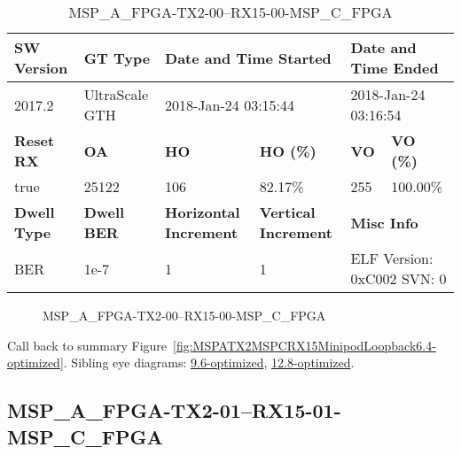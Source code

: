 \begin{table}[h]
\centering
\caption{MSP\_A\_FPGA-TX2-00--RX15-00-MSP\_C\_FPGA}
\label{tab:MSPAFPGATX200RX1500MSPCFPGA6.4-optimized}
\begin{tabular}{@{}|l|l|l|l|l|l|@{}}
\toprule
\textbf{SW Version}                & \textbf{GT Type}   & \multicolumn{2}{l|}{\textbf{Date and Time Started}}            & \multicolumn{2}{l|}{\textbf{Date and Time Ended}}        \\ \midrule
2017.2                       & UltraScale GTH          & \multicolumn{2}{l|}{2018-Jan-24 03:15:44}                   & \multicolumn{2}{l|}{2018-Jan-24 03:16:54}               \\ \midrule
\textbf{Reset RX}                  & \textbf{OA} & \textbf{HO}   & \textbf{HO (\%)} & \textbf{VO} & \textbf{VO (\%)} \\ \midrule
true & 25122        & 106          & 82.17\%        & 255        & 100.00\%       \\ \midrule
\textbf{Dwell Type}                & \textbf{Dwell BER} & \textbf{Horizontal Increment} & \textbf{Vertical Increment}    & \multicolumn{2}{l|}{\textbf{Misc Info}}                  \\ \midrule
BER                            & 1e-7        & 1        & 1           & \multicolumn{2}{l|}{ELF Version: 0xC002 SVN: 0}                         \\ \bottomrule
\end{tabular}
\end{table}

\begin{figure}[h]
\caption{MSP\_A\_FPGA-TX2-00--RX15-00-MSP\_C\_FPGA} \label{fig:MSPAFPGATX200RX1500MSPCFPGA6.4-optimized}
\end{figure}

Call back to summary Figure~\ref{fig:MSPATX2MSPCRX15MinipodLoopback6.4-optimized}.
Sibling eye diagrams: \hyperref[sec:MSPAFPGATX200RX1500MSPCFPGA9.6-optimized]{9.6-optimized}, \hyperref[sec:MSPAFPGATX200RX1500MSPCFPGA12.8-optimized]{12.8-optimized}.

\clearpage
\newpage


\subsection{MSP\_A\_FPGA-TX2-01--RX15-01-MSP\_C\_FPGA}\label{sec:MSPAFPGATX201RX1501MSPCFPGA6.4-optimized}


